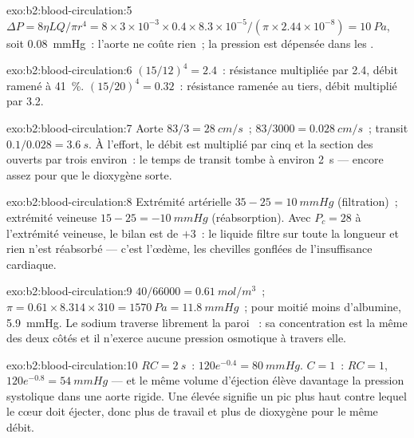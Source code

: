 \begin{solution}{exo:b2:blood-circulation:5}
$\Delta P = 8\eta LQ/\pi r^{4} = 8\times 3\times 10^{-3}\times
0.4\times 8.3\times 10^{-5}/(\pi\times 2.44\times 10^{-8}) =
\qty{10}{Pa}$, soit \qty{0.08}{mmHg}~: l'aorte ne coûte rien~; la
pression est dépensée dans les .
\end{solution}

\begin{solution}{exo:b2:blood-circulation:6}
$(15/12)^{4} = 2.4$~: résistance multipliée par 2.4, débit ramené à
\qty{41}{\%}. $(15/20)^{4} = 0.32$~: résistance ramenée au tiers, débit
multiplié par 3.2.
\end{solution}

\begin{solution}{exo:b2:blood-circulation:7}
Aorte $83/3 = \qty{28}{cm/s}$~;  $83/3000 =
\qty{0.028}{cm/s}$~; transit $0.1/0.028 = \qty{3.6}{s}$. À l'effort, le
débit est multiplié par cinq et la section des  ouverts par
trois environ~: le temps de transit tombe à environ \qty{2}{s} --- encore
assez pour que le dioxygène sorte.
\end{solution}

\begin{solution}{exo:b2:blood-circulation:8}
Extrémité artérielle $35 - 25 = \qty{+10}{mmHg}$ (filtration)~;
extrémité veineuse $15
- 25 = \qty{-10}{mmHg}$ (réabsorption). Avec $P_c = 28$ à l'extrémité
veineuse, le bilan est de $+3$~: le liquide filtre sur toute la longueur
et rien n'est réabsorbé --- c'est l'œdème, les chevilles gonflées de
l'insuffisance cardiaque.
\end{solution}

\begin{solution}{exo:b2:blood-circulation:9}
$40/66000 = \qty{0.61}{mol/m^3}$~; $\pi = 0.61\times 8.314\times 310 =
\qty{1570}{Pa} = \qty{11.8}{mmHg}$~; pour moitié moins d'albumine,
\qty{5.9}{mmHg}. Le sodium traverse librement la paroi ~: sa
concentration est la même des deux côtés et il n'exerce aucune pression
osmotique à travers elle.
\end{solution}

\begin{solution}{exo:b2:blood-circulation:10}
$RC = \qty{2}{s}$~: $120e^{-0.4} = \qty{80}{mmHg}$. $C = 1$~: $RC = 1$,
$120e^{-0.8} = \qty{54}{mmHg}$ --- et le même volume d'éjection élève
davantage la pression systolique dans une aorte rigide. Une  élevée signifie un pic plus haut contre lequel le cœur
doit éjecter, donc plus de travail et plus de dioxygène pour le même
débit.
\end{solution}

